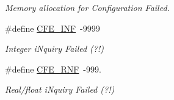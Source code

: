 \begin{DoxyCompactItemize}
\begin{DoxyCompactList}\small\item\em Memory allocation for Configuration Failed. \end{DoxyCompactList}\item 
\hypertarget{group__errors_gac6a0861a0e376a94e540d7ba95ebe9cf}{\#define \hyperlink{group__errors_gac6a0861a0e376a94e540d7ba95ebe9cf}{C\-F\-E\-\_\-\-I\-N\-F}~-\/9999}\label{group__errors_gac6a0861a0e376a94e540d7ba95ebe9cf}

\begin{DoxyCompactList}\small\item\em Integer i\-Nquiry Failed (?!) \end{DoxyCompactList}\item 
\hypertarget{group__errors_ga0415e4b197dc2908a58c026c4e621578}{\#define \hyperlink{group__errors_ga0415e4b197dc2908a58c026c4e621578}{C\-F\-E\-\_\-\-R\-N\-F}~-\/999.}\label{group__errors_ga0415e4b197dc2908a58c026c4e621578}

\begin{DoxyCompactList}\small\item\em Real/float i\-Nquiry Failed (?!) \end{DoxyCompactList}\end{DoxyCompactItemize}
